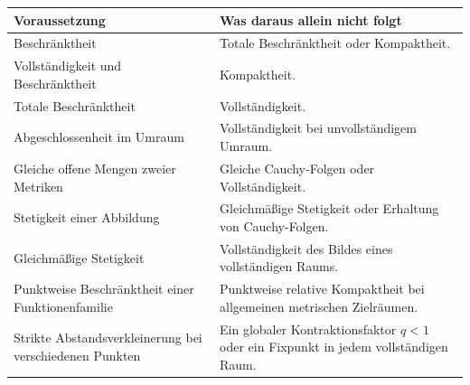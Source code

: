 \begin{center}
\small
\begin{tabularx}{\linewidth}{@{}p{.40\linewidth}X@{}}
\toprule
Voraussetzung & Was daraus allein nicht folgt\\
\midrule
Beschränktheit & Totale Beschränktheit oder Kompaktheit.\\[4pt]
Vollständigkeit und Beschränktheit & Kompaktheit.\\[4pt]
Totale Beschränktheit & Vollständigkeit.\\[4pt]
Abgeschlossenheit im Umraum & Vollständigkeit bei unvollständigem Umraum.\\[4pt]
Gleiche offene Mengen zweier Metriken & Gleiche Cauchy-Folgen oder
Vollständigkeit.\\[4pt]
Stetigkeit einer Abbildung & Gleichmäßige Stetigkeit oder Erhaltung
von Cauchy-Folgen.\\[4pt]
Gleichmäßige Stetigkeit & Vollständigkeit des Bildes eines vollständigen
Raums.\\[4pt]
Punktweise Beschränktheit einer Funktionenfamilie & Punktweise relative
Kompaktheit bei allgemeinen metrischen Zielräumen.\\[4pt]
Strikte Abstandsverkleinerung bei verschiedenen Punkten & Ein globaler
Kontraktionsfaktor $q<1$ oder ein Fixpunkt in jedem vollständigen Raum.\\
\bottomrule
\end{tabularx}
\end{center}

